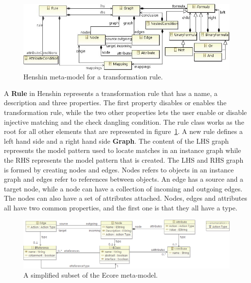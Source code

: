 \begin{figure}[H]
	\centering
	\includegraphics[scale=0.8]{./Figures/Henshin_metamodel.png}
	\caption[Henshin meta-model for a transformation rule]
	{Henshin meta-model for a transformation rule.}
	\label{fig:Henshin_metamodel}
\end{figure}

A \textbf{Rule} in Henshin represents a transformation rule that has a name,
a description and three properties. The first property disables or enables the
transformation rule, while the two other properties lets the user enable or
disable injective matching and the check dangling condition. The rule class
works as the root for all other elements that are represented in 
figure~\ref{fig:Henshin_metamodel}. A new rule defines a left hand side and a
right hand side \textbf{Graph}. The content of the LHS graph represents the
model pattern used to locate matches in an instance graph while the RHS
represents the model pattern that is created. The LHS and RHS graph is formed by
creating nodes and edges. Nodes refers to objects in an instance graph and
edges refer to references between objects. An edge has a source and a target
node, while a node can have a collection of incoming and outgoing edges. The
nodes can also have a set of attributes attached. Nodes, edges and attributes
all have two common properties, and the first one is that they all have a type.

\begin{figure}[H]
	\centering
	\includegraphics[scale=0.60]{./Figures/Node_edge_attribute.png}
	\caption[Henshin relationship with Ecore]
	{A simplified subset of the Ecore meta-model.}
	\label{fig:henshin_ecore}
\end{figure}

